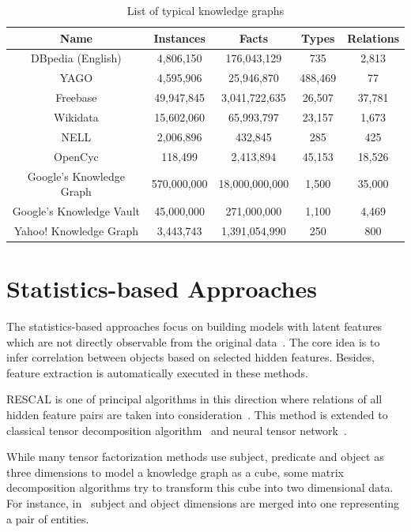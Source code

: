 \begin{table}
\begin{center}
\begin{tabular}{|c|c|c|c|c|}
\hline
Name & Instances & Facts & Types & Relations\\
\hline\hline
DBpedia (English) & 4,806,150 & 176,043,129 & 735 & 2,813\\
\hline
YAGO & 4,595,906 & 25,946,870 & 488,469 & 77\\
\hline
Freebase & 49,947,845 & 3,041,722,635 & 26,507 & 37,781\\
\hline
Wikidata & 15,602,060 & 65,993,797 & 23,157 & 1,673\\
\hline
NELL & 2,006,896 & 432,845 & 285 & 425\\
\hline
OpenCyc & 118,499 & 2,413,894 & 45,153 & 18,526\\
\hline
Google's Knowledge Graph & 570,000,000 & 18,000,000,000 & 1,500 & 35,000\\
\hline
Google's Knowledge Vault & 45,000,000 & 271,000,000 & 1,100 & 4,469\\
\hline
Yahoo! Knowledge Graph & 3,443,743 & 1,391,054,990 & 250 & 800\\
\hline
\end{tabular}
\end{center}
\caption{List of typical knowledge graphs}
\label{table1}
\end{table}

\section{Statistics-based Approaches}

The statistics-based approaches focus on building models with latent features which are not directly observable from the original data~\cite{ref1}. The core idea is to infer correlation between objects based on selected hidden features. Besides, feature extraction is automatically executed in these methods.

RESCAL is one of principal algorithms in this direction where relations of all hidden feature pairs are taken into consideration~\cite{ref2, ref3}. This method is extended to classical tensor decomposition algorithm~\cite{ref4} and neural tensor network~\cite{ref5}.

While many tensor factorization methods use subject, predicate and object as three dimensions to model a knowledge graph as a cube, some matrix decomposition algorithms try to transform this cube into two dimensional data. For instance, in~\cite{ref6, ref7} subject and object dimensions are merged into one representing a pair of entities.

